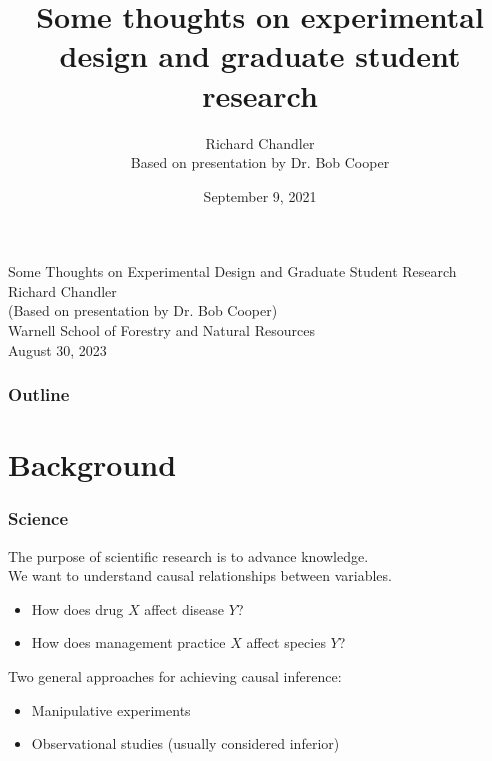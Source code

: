 \documentclass[color=usenames,dvipsnames]{beamer}\usepackage[]{graphicx}\usepackage[]{xcolor}
\title[slides]{Some thoughts on experimental design and
  graduate student research}
\author{Richard Chandler \\ Based on presentation by Dr. Bob Cooper}
\date{September 9, 2021}
\begin{document}
\begin{frame}[plain]
  \centering
  \LARGE
  Some Thoughts on Experimental Design and Graduate Student Research \\
  \vfill
  \large
  Richard Chandler \\
  (Based on presentation by Dr. Bob Cooper) \\
  Warnell School of Forestry and Natural Resources \\
  August 30, 2023
\end{frame}



\begin{frame}
  \frametitle{Outline}
  \Large
  \tableofcontents%
\end{frame}


\section{Background}


\begin{frame}
  \frametitle{Science}
  The purpose of scientific research is to advance knowledge. \\
  \pause
  \vfill
  We want to understand causal relationships between variables. \\
  \begin{itemize}
    \item How does drug $X$ affect disease $Y$?
    \item How does management practice $X$ affect species $Y$?
  \end{itemize}
  \pause
  \vfill
  Two general approaches for achieving causal inference:
  \begin{itemize}
    \item Manipulative experiments
    \item Observational studies (usually considered inferior)
  \end{itemize}
\end{frame}
\end{document}
